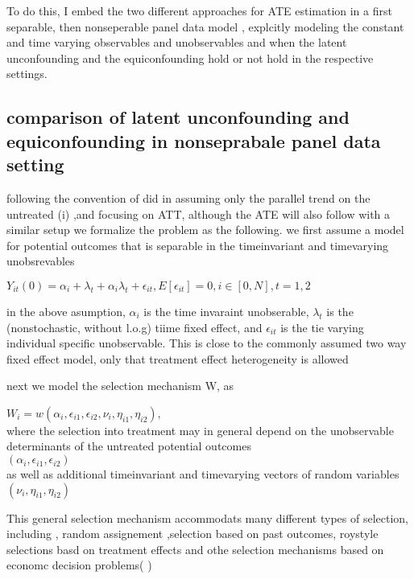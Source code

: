 \documentclass{article}
\begin{document}
To do this, I embed the two different approaches for ATE estimation in a first separable, then nonseperable panel data model ,  explcitly modeling the constant and time varying observables and unobservables and when the latent unconfounding and the equiconfounding hold or not hold in the respective settings.  





\subsection{comparison of latent unconfounding and equiconfounding in nonseprabale panel data setting}
 following the convention of did in assuming only the parallel trend on the untreated (i) ,and focusing on ATT, although the ATE will also follow with a similar setup
 we formalize the problem as the following.
     we first assume a model for potential outcomes that is separable in the timeinvariant and timevarying unobsrevables
    \begin{assumption}
     $Y_{it} ( 0) = \alpha_i + \lambda_t + \alpha_i \lambda_t +\epsilon_{it}  , E[ \epsilon_{it} ] = 0 , i \in [0, N] , t =1,2$
     \end{assumption}
 in the above asumption, $\alpha_i$ is the time invaraint unobserable, $\lambda_t$ is the (nonstochastic, without l.o.g) tiime fixed effect, and $\epsilon_{it} $ is the tie varying individual specific unobservable. This is close to the commonly assumed two way fixed effect model, only that treatment effect heterogeneity is allowed
 
 next we model the selection mechanism W, as 

$ W_i = w( \alpha_i, \epsilon_{i1}, \epsilon_{i2}, \nu_i, \eta_{i1}, \eta_{i2} )  $, \\
where the selection into treatment may in general   depend on the unobservable determinants of the untreated potential outcomes  \\
 $(\alpha_i, \epsilon_{i1}, \epsilon_{i2} )$\\
as well as additional timeinvariant and timevarying vectors of random variables $ (\nu_i, \eta_{i1}, \eta_{i2} )$

 This general selection mechanism accommodats many different types of selection, including , random assignement ,selection based on past outcomes, roystyle selections basd on treatment effects and othe selection mechanisms based on economc decision problems( \cite{heckman and robb} )
 
\end{document}
